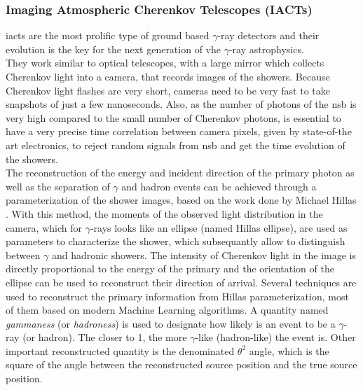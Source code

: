 \documentclass[main.tex]{subfiles}
\begin{document}
\subsubsection{Imaging Atmospheric Cherenkov Telescopes (IACTs)} \label{sec:IACTs}

\glspl{iact} are the most prolific type of ground based $\gamma$-ray detectors and their evolution is the key for the next generation of \gls{vhe} $\gamma$-ray astrophysics.\\
They work similar to optical telescopes, with a large mirror which collects Cherenkov light into a camera, that records images of the showers. 
Because Cherenkov light flashes are very short, cameras need to be very fast to take snapshots of just  a few nanoseconds. Also, as the number of photons of the \gls{nsb} is very high compared to the small number of Cherenkov photons, is essential to have a very precise time correlation between camera pixels, given by state-of-the art electronics, to reject random signals from \gls{nsb} and get the time evolution of the showers.\\
The reconstruction of the energy and incident direction of the primary photon as well as the separation of $\gamma$ and hadron events can be achieved through a parameterization of the shower images, based on the work done by Michael Hillas \cite{1985Hillas}. With this method, the moments of the observed light distribution in the camera, which for $\gamma$-rays looks like an ellipse (named Hillas ellipse), are used as parameters to characterize the shower, which subsequantly allow to distinguish between $\gamma$  and hadronic showers. 
The intensity of Cherenkov light in the image is directly proportional to the energy of the primary and the orientation of the ellipse can be used to reconstruct their direction of arrival. Several techniques are used to reconstruct the primary information from Hillas parameterization, most of them based on modern Machine Learning algorithms. A quantity named \textit{gammaness} (or \textit{hadroness}) is used to designate how likely is an event to be a $\gamma$-ray (or hadron). The closer to 1, the more $\gamma$-like (hadron-like) the event is. Other important reconstructed quantity is the denominated $\theta^2$ angle, which is the square of the angle between the reconstructed source position and the true source position. 
\end{document}
